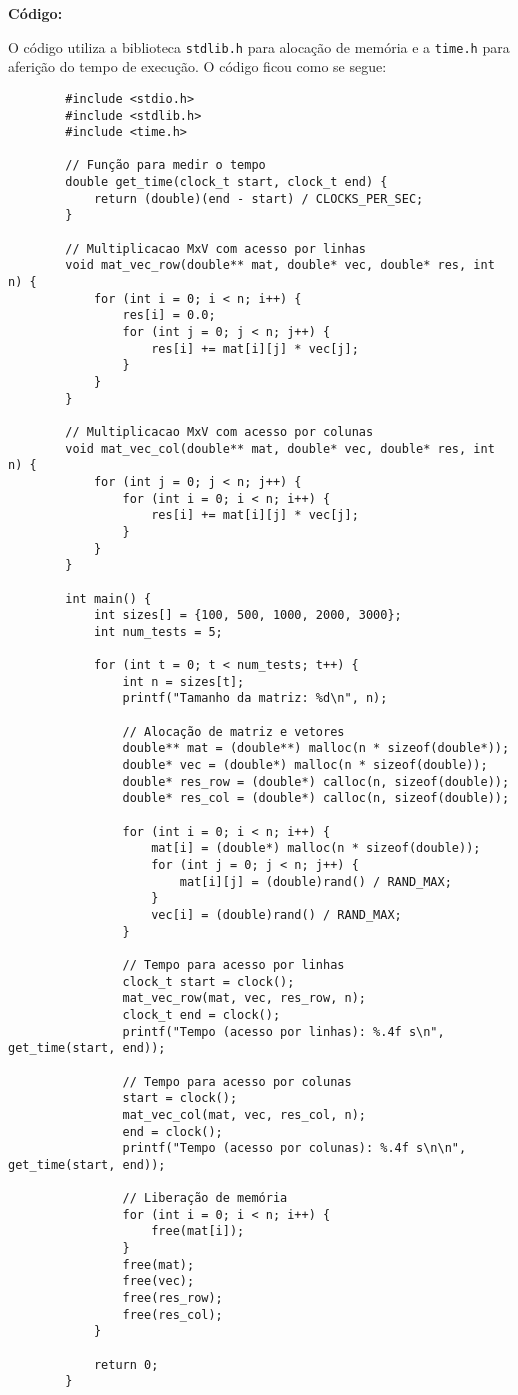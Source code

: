 \documentclass[a4paper, 12pt]{article}
\begin{document}
	\vspace{1cm}
	
	\textbf{Código:}
	
	O código utiliza a biblioteca \texttt{stdlib.h} para alocação de memória e a \texttt{time.h} para aferição do tempo de execução. O código ficou como se segue:
	
	\begin{verbatim}
		#include <stdio.h>
		#include <stdlib.h>
		#include <time.h>
		
		// Função para medir o tempo
		double get_time(clock_t start, clock_t end) {
			return (double)(end - start) / CLOCKS_PER_SEC;
		}
		
		// Multiplicacao MxV com acesso por linhas
		void mat_vec_row(double** mat, double* vec, double* res, int n) {
			for (int i = 0; i < n; i++) {
				res[i] = 0.0;
				for (int j = 0; j < n; j++) {
					res[i] += mat[i][j] * vec[j];
				}
			}
		}
		
		// Multiplicacao MxV com acesso por colunas
		void mat_vec_col(double** mat, double* vec, double* res, int n) {
			for (int j = 0; j < n; j++) {
				for (int i = 0; i < n; i++) {
					res[i] += mat[i][j] * vec[j];
				}
			}
		}
		
		int main() {
			int sizes[] = {100, 500, 1000, 2000, 3000};
			int num_tests = 5;
			
			for (int t = 0; t < num_tests; t++) {
				int n = sizes[t];
				printf("Tamanho da matriz: %d\n", n);
				
				// Alocação de matriz e vetores
				double** mat = (double**) malloc(n * sizeof(double*));
				double* vec = (double*) malloc(n * sizeof(double));
				double* res_row = (double*) calloc(n, sizeof(double));
				double* res_col = (double*) calloc(n, sizeof(double));
				
				for (int i = 0; i < n; i++) {
					mat[i] = (double*) malloc(n * sizeof(double));
					for (int j = 0; j < n; j++) {
						mat[i][j] = (double)rand() / RAND_MAX;
					}
					vec[i] = (double)rand() / RAND_MAX;
				}
				
				// Tempo para acesso por linhas
				clock_t start = clock();
				mat_vec_row(mat, vec, res_row, n);
				clock_t end = clock();
				printf("Tempo (acesso por linhas): %.4f s\n", get_time(start, end));
				
				// Tempo para acesso por colunas
				start = clock();
				mat_vec_col(mat, vec, res_col, n);
				end = clock();
				printf("Tempo (acesso por colunas): %.4f s\n\n", get_time(start, end));
				
				// Liberação de memória
				for (int i = 0; i < n; i++) {
					free(mat[i]);
				}
				free(mat);
				free(vec);
				free(res_row);
				free(res_col);
			}
			
			return 0;
		}
		
	\end{verbatim}
	
\end{document}
